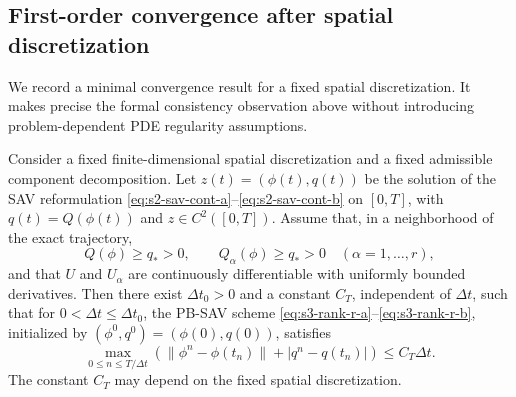 \documentclass[10pt,onefignum,onetabnum,hidelinks]{siamart251216}
\begin{document}
\subsection{First-order convergence after spatial discretization}
\label{subsec:first-order-convergence}

We record a minimal convergence result for a fixed spatial discretization. It
makes precise the formal consistency observation above without introducing
problem-dependent PDE regularity assumptions.

\begin{theorem}
\label{thm:first-order-convergence}
Consider a fixed finite-dimensional spatial discretization and a fixed
admissible component decomposition. Let
\(z(t)=(\phi(t),q(t))\) be the solution of the SAV reformulation
\eqref{eq:s2-sav-cont-a}--\eqref{eq:s2-sav-cont-b} on \([0,T]\), with
\(q(t)=Q(\phi(t))\) and \(z\in C^2([0,T])\). Assume that, in a neighborhood
of the exact trajectory,
\[
Q(\phi)\ge q_*>0,\qquad Q_\alpha(\phi)\ge q_*>0
\quad (\alpha=1,\ldots,r),
\]
and that \(U\) and \(U_\alpha\) are continuously differentiable with
uniformly bounded derivatives. Then there exist \(\Delta t_0>0\) and a
constant \(C_T\), independent of \(\Delta t\), such that for
\(0<\Delta t\le\Delta t_0\), the PB-SAV scheme
\eqref{eq:s3-rank-r-a}--\eqref{eq:s3-rank-r-b}, initialized by
\((\phi^0,q^0)=(\phi(0),q(0))\), satisfies
\[
\max_{0\le n\le T/\Delta t}
\left(\|\phi^n-\phi(t_n)\|+|q^n-q(t_n)|\right)
\le C_T\Delta t .
\]
The constant \(C_T\) may depend on the fixed spatial discretization.
\end{theorem}
\end{document}
